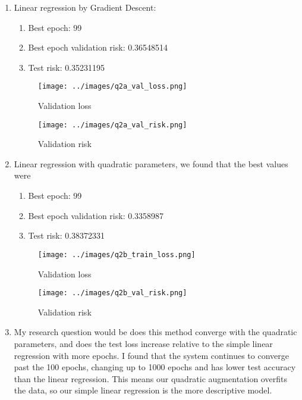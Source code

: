 \begin{enumerate}
  \item Linear regression by Gradient Descent:
  \begin{enumerate}
    \item Best epoch: 99
    \item Best epoch validation risk: 0.36548514
    \item Test risk: 0.35231195
  \end{enumerate}
  \begin{figure}[h]
      \centering
      \begin{minipage}{0.49\textwidth}
          \centering
	  \texttt{[image: ../images/q2a\_val\_loss.png]}
          \caption{Validation loss}
      \end{minipage}
      \hfill
      \begin{minipage}{0.49\textwidth}
          \centering
	  \texttt{[image: ../images/q2a\_val\_risk.png]}
          \caption{Validation risk}
      \end{minipage}
  \end{figure}
  \item Linear regression with quadratic parameters, we found that the best values were
  \begin{enumerate}
    \item Best epoch: 99
    \item Best epoch validation risk: 0.3358987
    \item Test risk: 0.38372331
  \end{enumerate}
  \begin{figure}[h]
      \centering
      \begin{minipage}{0.49\textwidth}
          \centering
	  \texttt{[image: ../images/q2b\_train\_loss.png]}
          \caption{Validation loss}
      \end{minipage}
      \hfill
      \begin{minipage}{0.49\textwidth}
          \centering
	  \texttt{[image: ../images/q2b\_val\_risk.png]}
          \caption{Validation risk}
      \end{minipage}
  \end{figure}
  \item My research question would be does this method converge with the quadratic parameters, and does the test loss increase relative to the simple linear regression with more epochs. I found that the system continues to converge past the 100 epochs, changing up to 1000 epochs and has lower test accuracy than the linear regression. This means our quadratic augmentation overfits the data, so our simple linear regression is the more descriptive model.
\end{enumerate}
